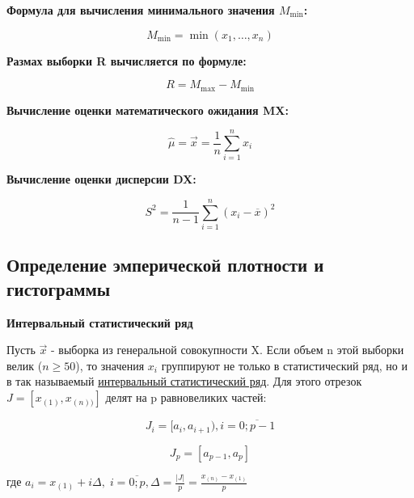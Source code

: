 \documentclass[12pt, a4paper]{report}
\begin{document}
	\textbf{Формула для вычисления минимального значения $M_{\min}$:}
	
	\begin{equation*} \label{Mmin}
	M_{\min} = \min{(x_1, \dots, x_n)}
	\end{equation*}
	
	\textbf{Размах выборки R вычисляется по формуле:}
	
	\begin{equation*} \label{R}
	R = M_{\max} - M_{\min}
	\end{equation*}
	
	\textbf{Вычисление оценки математического ожидания MX:}
	
	\begin{equation*}
	\hat{\mu} = \vec{x} = \frac{1}{n}\sum_{i=1}^{n} x_i
	\end{equation*}
	
	\textbf{Вычисление оценки дисперсии DX:}
	
	\begin{equation*}
	S^2 = \frac{1}{n-1} \sum_{i=1}^n (x_i - \overline{x})^2
	\end{equation*}
	
	\vspace{0.5cm}
	\subsection{Определение эмперической плотности и гистограммы}
	
	\hspace{0.5cm} \textbf{Интервальный статистический ряд}
	
	Пусть $\vec{x}$ - выборка из генеральной совокупности X. Если объем n этой выборки велик ($n\geq50$), то значения $x_i$ группируют не только в статистический ряд, но и в так называемый \underline{интервальный статистический ряд}. Для этого отрезок $J = [x_{(1)}, x_{(n))}]$ делят на p равновеликих частей:
	
	\begin{equation*}
	J_i = [a_i,a_{i+1}), i = \overline{0;p-1}
	\end{equation*}
	
	\begin{equation*}
	J_p = [a_{p-1},a_{p}]
	\end{equation*}
	
	\vspace{0.5cm}где $a_i = x_{(1)} + i\Delta,\; i = \overline{0;p}, \Delta = \frac{|J|}{p} = \frac{x_{(n)} - x_{(1)}}{p}$
	
\end{document}
